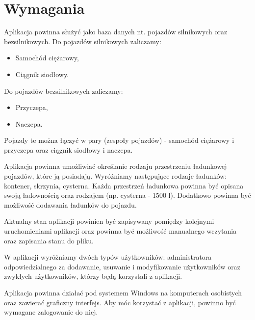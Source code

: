 \chapter{Wymagania}

Aplikacja powinna służyć jako baza danych nt. pojazdów silnikowych oraz bezsilnikowych.
Do pojazdów silnikowych zaliczamy:
\begin{itemize}
    \item Samochód ciężarowy,
    \item Ciągnik siodłowy.
\end{itemize}
Do pojazdów bezsilnikowych zaliczamy:
\begin{itemize}
    \item Przyczepa,
    \item Naczepa.
\end{itemize}
Pojazdy te można łączyć w pary (zespoły pojazdów) - samochód ciężarowy i przyczepa oraz ciągnik siodłowy i naczepa.

Aplikacja powinna umożliwiać określanie rodzaju przestrzeniu ładunkowej pojazdów, które ją posiadają. Wyróżniamy
następujące rodzaje ładunków: kontener, skrzynia, cysterna. Każda przestrzeń ładunkowa powinna być opisana swoją
ładownością oraz rodzajem (np. cysterna - 1500 \si{\litre}). Dodatkowo powinna być możliwość dodawania ładunków
do pojazdu.

Aktualny stan aplikacji powinien być zapisywany pomiędzy kolejnymi uruchomieniami aplikacji oraz
powinna być możliwość manualnego wczytania oraz zapisania stanu do pliku.

W aplikacji wyróżniamy dwóch typów użytkowników: administratora odpowiedzialnego za dodawanie, usuwanie i
modyfikowanie użytkowników oraz zwykłych użytkowników, którzy będą korzystali z aplikacji.

Aplikacja powinna działać pod systemem Windows na komputerach osobistych oraz zawierać graficzny interfejs.
Aby móc korzystać z aplikacji, powinno być wymagane zalogowanie do niej.

